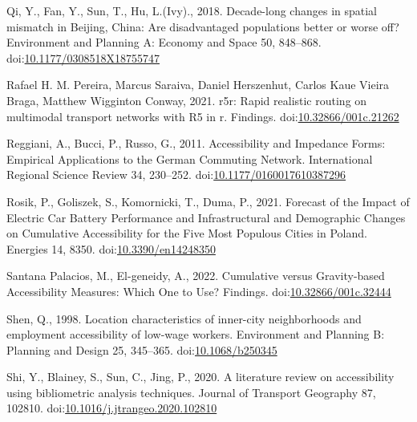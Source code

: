 \documentclass[]{elsarticle} %
\newlength{\cslhangindent}
\newlength{\cslentryspacingunit} %
\newenvironment{CSLReferences}[2] %
 {%
  \setlength{\parindent}{0pt}
  \ifodd #1
  \let\oldpar\par
  \def\par{\hangindent=\cslhangindent\oldpar}
  \fi
  \setlength{\parskip}{#2\cslentryspacingunit}
 }%
 {}
\begin{document}
\begin{CSLReferences}{1}{0}
\leavevmode{}%
Qi, Y., Fan, Y., Sun, T., Hu, L.(Ivy)., 2018. Decade-long changes in
spatial mismatch in {Beijing}, {China}: {Are} disadvantaged populations
better or worse off? Environment and Planning A: Economy and Space 50,
848--868.
doi:\href{https://doi.org/10.1177/0308518X18755747}{10.1177/0308518X18755747}

\leavevmode{}%
Rafael H. M. Pereira, Marcus Saraiva, Daniel Herszenhut, Carlos Kaue
Vieira Braga, Matthew Wigginton Conway, 2021. r5r: Rapid realistic
routing on multimodal transport networks with R5 in r. Findings.
doi:\href{https://doi.org/10.32866/001c.21262}{10.32866/001c.21262}

\leavevmode{}%
Reggiani, A., Bucci, P., Russo, G., 2011. Accessibility and {Impedance}
{Forms}: {Empirical} {Applications} to the {German} {Commuting}
{Network}. International Regional Science Review 34, 230--252.
doi:\href{https://doi.org/10.1177/0160017610387296}{10.1177/0160017610387296}

\leavevmode{}%
Rosik, P., Goliszek, S., Komornicki, T., Duma, P., 2021. Forecast of the
{Impact} of {Electric} {Car} {Battery} {Performance} and
{Infrastructural} and {Demographic} {Changes} on {Cumulative}
{Accessibility} for the {Five} {Most} {Populous} {Cities} in {Poland}.
Energies 14, 8350.
doi:\href{https://doi.org/10.3390/en14248350}{10.3390/en14248350}

\leavevmode{}%
Santana Palacios, M., El-geneidy, A., 2022. Cumulative versus
Gravity-based Accessibility Measures: Which One to Use? Findings.
doi:\href{https://doi.org/10.32866/001c.32444}{10.32866/001c.32444}

\leavevmode{}%
Shen, Q., 1998. Location characteristics of inner-city neighborhoods and
employment accessibility of low-wage workers. Environment and Planning
B: Planning and Design 25, 345--365.
doi:\href{https://doi.org/10.1068/b250345}{10.1068/b250345}

\leavevmode{}%
Shi, Y., Blainey, S., Sun, C., Jing, P., 2020. A literature review on
accessibility using bibliometric analysis techniques. Journal of
Transport Geography 87, 102810.
doi:\href{https://doi.org/10.1016/j.jtrangeo.2020.102810}{10.1016/j.jtrangeo.2020.102810}


\end{CSLReferences}
\end{document}
